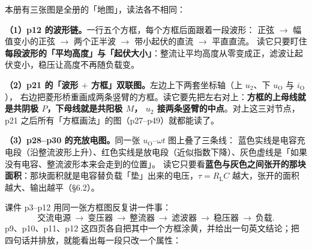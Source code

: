 \documentclass[11pt]{ctexart}
\begin{document}



本册有三张图是全册的「地图」，读法各不相同：

\textbf{（1）p12 的波形链。}一行五个方框，每个方框后面跟着一段波形：
正弦 $\to$ 幅值变小的正弦 $\to$ 两个正半波 $\to$ 带小起伏的直流 $\to$ 平直直流。
读它只要盯住\textbf{每段波形的「平均高度」与「起伏大小」}：整流让平均高度从零变成正，滤波让起伏变小，稳压让高度不再随负载变。

\textbf{（2）p21 的「波形 $+$ 方框」双联图。}左边上下两套坐标轴（上 $u_2$、下 $u_{\mathrm{O}}$ 与 $i_{\mathrm{O}}$），
右边把菱形桥重画成两条竖臂的方框。读它要先把左右对上：\textbf{方框的上母线就是共阴极 $P$，下母线就是共阳极 $M$，
$u_2$ 接两条竖臂的中点}。对上这三对节点，p21 之后所有「方框画法」的图（p27--p49）就都能读了。

\textbf{（3）p28--p30 的充放电图。}同一张 $u_{\mathrm{O}}$–$\omega t$ 图上叠了三条线：
蓝色实线是电容充电段（沿整流波形上升）、红色实线是放电段（近似指数下降）、灰色虚线是「如果没有电容、整流波形本来会走到的位置」。
读它只要看\textbf{蓝色与灰色之间张开的那块面积}：那块面积就是电容替负载「垫」出来的电压，$\tau=R_{\mathrm{L}}C$ 越大，张开的面积越大、输出越平（§6.2）。



课件 p3--p12 用同一张方框图反复讲一件事：
\[ \text{交流电源}\ \longrightarrow\ \text{变压器}\ \longrightarrow\ \text{整流器}\ \longrightarrow\ \text{滤波器}\ \longrightarrow\ \text{稳压器}\ \longrightarrow\ \text{负载} . \]
p9、p10、p11、p12 这四页各自把其中一个方框涂黄，并给出一句英文结论；把四句话并排放，就能看出每一段只改一个属性：
\end{document}
